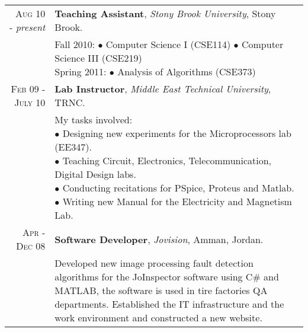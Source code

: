 \documentclass[a4paper, oneside, final]{scrartcl}
\newcommand{\twidthb}{12.65cm}
\begin{document}
\begin{tabular}{rm{\twidthb}}
\textsc{Aug 10} - \emph{present}  & \textbf{Teaching Assistant}, \emph{Stony Brook University}, Stony Brook. \\
                    & \footnotesize{\parbox{\twidthb}{
                        Fall 2010:
                        $\bullet$ Computer Science I (CSE114)
                        $\bullet$ Computer Science III (CSE219)\\
                        Spring 2011: $\bullet$ Analysis of Algorithms (CSE373)}}

\\\textsc{Feb 09 - July 10}  & \textbf{Lab Instructor}, \emph{Middle East Technical University}, TRNC. \\
                    & \footnotesize{\parbox{\twidthb}{
                        My tasks involved: \\
                        $\bullet$ Designing new experiments for the Microprocessors lab (EE347).\\
                        $\bullet$ Teaching Circuit, Electronics, Telecommunication, Digital Design labs.\\
                        $\bullet$ Conducting recitations for PSpice, Proteus and Matlab.\\
                        $\bullet$ Writing new Manual for the Electricity and Magnetism Lab.}}   

   \\ \textsc{Apr - Dec 08}  & \textbf{Software Developer}, \emph{Jovision}, Amman, Jordan. \\
                         & \footnotesize{Developed new image processing fault detection algorithms for the JoInspector software using C\# and MATLAB, the software is used in tire factories QA departments. Established the IT infrastructure and the work environment and constructed a new website.}

\\ 

\end{tabular}
\end{document}
